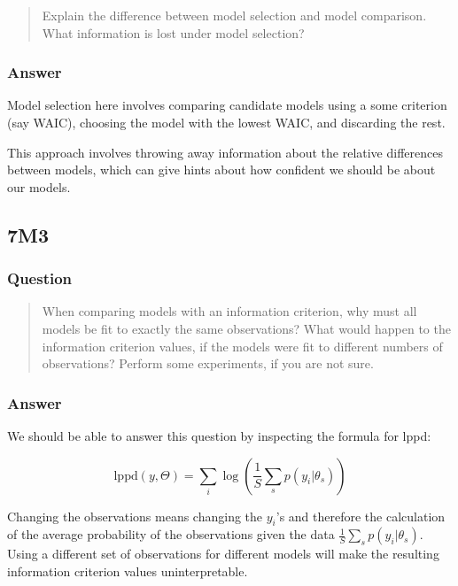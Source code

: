 \documentclass[
]{book}
\begin{document}
\begin{quote}
Explain the difference between model selection and model comparison. What information is lost under model selection?
\end{quote}

\hypertarget{answer-65}{%
\subsubsection*{Answer}\label{answer-65}}

Model selection here involves comparing candidate models using a some criterion (say WAIC), choosing the model with the lowest WAIC, and discarding the rest.

This approach involves throwing away information about the relative differences between models, which can give hints about how confident we should be about our models.

\hypertarget{m3-4}{%
\subsection*{7M3}\label{m3-4}}

\hypertarget{question-66}{%
\subsubsection*{Question}\label{question-66}}

\begin{quote}
When comparing models with an information criterion, why must all models be fit to exactly the same observations? What would happen to the information criterion values, if the models were fit to different numbers of observations? Perform some experiments, if you are not sure.
\end{quote}

\hypertarget{answer-66}{%
\subsubsection*{Answer}\label{answer-66}}

We should be able to answer this question by inspecting the formula for lppd:

\[
\text{lppd}(y,\Theta) = \sum_i \log \left( \frac{1}{S}\sum_s p(y_i | \theta_s) \right)
\]

Changing the observations means changing the \(y_i\)'s and therefore the calculation of the average probability of the observations given the data \(\frac{1}{S}\sum_s p(y_i | \theta_s)\). Using a different set of observations for different models will make the resulting information criterion values uninterpretable.
\end{document}
